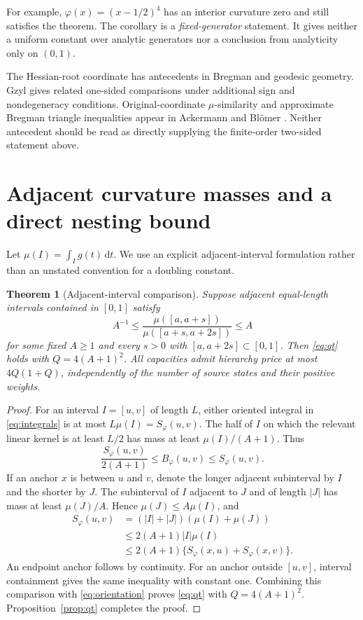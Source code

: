 \documentclass[11pt]{article}
\newtheorem{theorem}{Theorem}[section]
\theoremstyle{definition}\newtheorem{definition}[theorem]{Definition}
\theoremstyle{remark}\newtheorem{remark}[theorem]{Remark}
\newcommand{\ph}{\varphi}
\newcommand{\B}{B_{\ph}}
\newcommand{\rd}{\,\mathrm d}
\begin{document}
For example, $\ph(x)=(x-1/2)^4$ has an interior curvature zero and still satisfies the theorem. The corollary is a \emph{fixed-generator} statement. It gives neither a uniform constant over analytic generators nor a conclusion from analyticity only on $(0,1)$.

The Hessian-root coordinate has antecedents in Bregman and geodesic geometry. Gzyl \cite[Section 6]{gzyl} gives related one-sided comparisons under additional sign and nondegeneracy conditions. Original-coordinate $\mu$-similarity and approximate Bregman triangle inequalities appear in Ackermann and Bl\"omer \cite[Definition 2.2 and Lemma 2.2]{ackermann}. Neither antecedent should be read as directly supplying the finite-order two-sided statement above.

\section{Adjacent curvature masses and a direct nesting bound}
\label{sec:doubling}
Let $\mu(I)=\int_I g(t)\rd t$. We use an explicit adjacent-interval formulation rather than an unstated convention for a doubling constant.
\begin{theorem}[Adjacent-interval comparison]
\label{thm:doubling}
Suppose adjacent equal-length intervals contained in $[0,1]$ satisfy
\begin{equation}
A^{-1}\le\frac{\mu([a,a+s])}{\mu([a+s,a+2s])}\le A
\label{eq:adjacent}
\end{equation}
for some fixed $A\ge1$ and every $s>0$ with $[a,a+2s]\subset[0,1]$. Then \eqref{eq:qt} holds with $Q=4(A+1)^2$. All capacities admit hierarchy price at most $4Q(1+Q)$, independently of the number of source states and their positive weights.
\end{theorem}
\begin{proof}
For an interval $I=[u,v]$ of length $L$, either oriented integral in \eqref{eq:integrals} is at most $L\mu(I)=S_\ph(u,v)$. The half of $I$ on which the relevant linear kernel is at least $L/2$ has mass at least $\mu(I)/(A+1)$. Thus
\begin{equation}
\frac{S_\ph(u,v)}{2(A+1)}\le\B(u,v)\le S_\ph(u,v).
\label{eq:orientation}
\end{equation}
If an anchor $x$ is between $u$ and $v$, denote the longer adjacent subinterval by $I$ and the shorter by $J$. The subinterval of $I$ adjacent to $J$ and of length $|J|$ has mass at least $\mu(J)/A$. Hence $\mu(J)\le A\mu(I)$, and
\begin{align*}
S_\ph(u,v)&=(|I|+|J|)(\mu(I)+\mu(J))\\
&\le2(A+1)|I|\mu(I)\\
&\le2(A+1)\{S_\ph(x,u)+S_\ph(x,v)\}.
\end{align*}
An endpoint anchor follows by continuity. For an anchor outside $[u,v]$, interval containment gives the same inequality with constant one. Combining this comparison with \eqref{eq:orientation} proves \eqref{eq:qt} with $Q=4(A+1)^2$. Proposition~\ref{prop:qt} completes the proof.
\end{proof}
\end{document}
